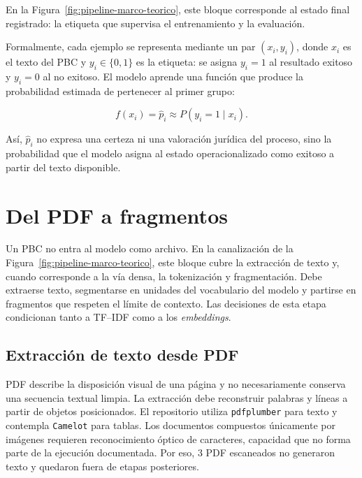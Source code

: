 En la Figura~\ref{fig:pipeline-marco-teorico}, este bloque corresponde al estado final registrado: la etiqueta que supervisa el entrenamiento y la evaluación.



Formalmente, cada ejemplo se representa mediante un par $(x_i,y_i)$, donde $x_i$ es el texto del PBC y $y_i\in\{0,1\}$ es la etiqueta: se asigna $y_i=1$ al resultado exitoso y $y_i=0$ al no exitoso. El modelo aprende una función que produce la probabilidad estimada de pertenecer al primer grupo:

\begin{equation}
  f(x_i)=\hat p_i \approx P(y_i=1\mid x_i).
\end{equation}

Así, $\hat p_i$ no expresa una certeza ni una valoración jurídica del proceso, sino la probabilidad que el modelo asigna al estado operacionalizado como exitoso a partir del texto disponible.

\section{Del PDF a fragmentos}
\label{sec:pdf_a_fragmentos}

Un PBC no entra al modelo como archivo. En la canalización de la Figura~\ref{fig:pipeline-marco-teorico}, este bloque cubre la extracción de texto y, cuando corresponde a la vía densa, la tokenización y fragmentación. Debe extraerse texto, segmentarse en unidades del vocabulario del modelo y partirse en fragmentos que respeten el límite de contexto. Las decisiones de esta etapa condicionan tanto a TF--IDF como a los \textit{embeddings}.

\subsection{Extracción de texto desde PDF}

PDF describe la disposición visual de una página y no necesariamente conserva una secuencia textual limpia. La extracción debe reconstruir palabras y líneas a partir de objetos posicionados. El repositorio utiliza \texttt{pdfplumber} para texto y contempla \texttt{Camelot} para tablas. Los documentos compuestos únicamente por imágenes requieren reconocimiento óptico de caracteres, capacidad que no forma parte de la ejecución documentada. Por eso, 3 PDF escaneados no generaron texto y quedaron fuera de etapas posteriores.

